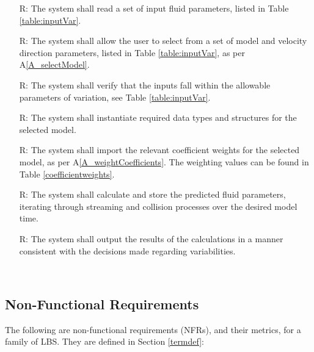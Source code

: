 \documentclass[12pt]{article}
\newcounter{reqnum} %
\begin{document}
\noindent \begin{itemize}

\item[R\refstepcounter{reqnum}\thereqnum \label{R_Inputs}:] The system shall read a set of input fluid parameters, listed in Table \ref{table:inputVar}.

\item[R\refstepcounter{reqnum}\thereqnum \label{R_ModelInputs}:] The system shall allow the user to select from a set of model and velocity direction parameters, listed in Table \ref{table:inputVar}, as per A\ref{A_selectModel}.

\item[R\refstepcounter{reqnum}\thereqnum \label{R_CheckInputs}:] The system shall verify that the inputs fall within the allowable parameters of variation, see Table \ref{table:inputVar}.

\item[R\refstepcounter{reqnum}\thereqnum \label{R_Instantiate}:] The system shall instantiate required data types and structures for the selected model.

\item[R\refstepcounter{reqnum}\thereqnum \label{R_CoefficientWeights}:] The system shall import the relevant coefficient weights for the selected model, as per A\ref{A_weightCoefficients}. The weighting values can be found in Table \ref{coefficientweights}.

\item[R\refstepcounter{reqnum}\thereqnum \label{R_Calculate}:] The system shall calculate and store the predicted fluid parameters, iterating through streaming and collision processes over the desired model time.

\item[R\refstepcounter{reqnum}\thereqnum \label{R_Output}:] The system shall output the results of the calculations in a manner consistent with the decisions made regarding variabilities.

\end{itemize}

~\newpage

\subsection{Non-Functional Requirements}

The following are non-functional requirements (NFRs), and their metrics, for a family of LBS. They are defined in Section \ref{termdef}:
\end{document}
